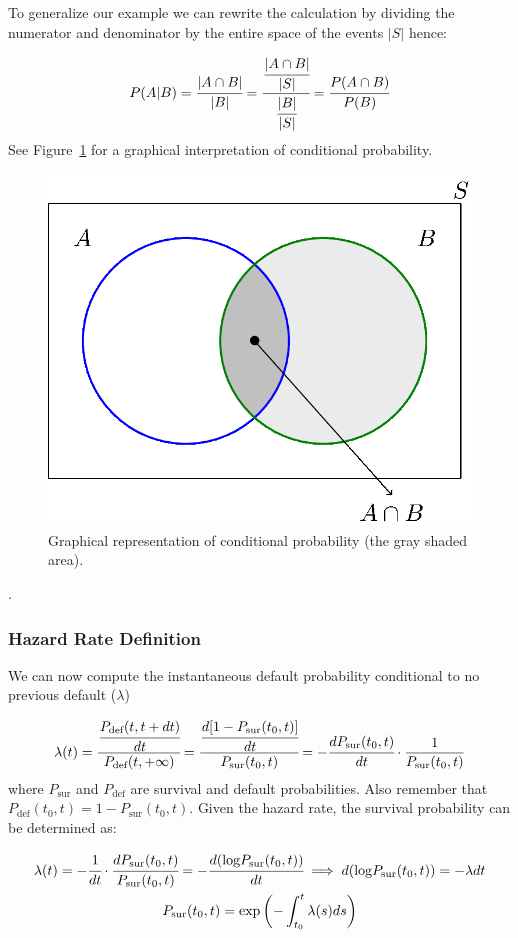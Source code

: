 To generalize our example we can rewrite the calculation by dividing the numerator and denominator by the entire space of the events \(|S|\) hence:

\begin{equation}
P(A|B) = \cfrac{|A\cap B|}{|B|} = \cfrac{\cfrac{|A\cap B|}{|S|}}{\cfrac{|B|}{|S|}} = \cfrac{P(A\cap B)}{P(B)}
\end{equation}
See Figure~\ref{fig:conditional_prob} for a graphical interpretation of conditional probability.

\begin{figure}[tb]
\centering
\includegraphics[width=0.5\linewidth]{figures/conditional_b}
\caption{Graphical representation of conditional probability (the gray shaded area).}
\label{fig:conditional_prob}
\end{figure}
.
\subsubsection{Hazard Rate Definition}
We can now compute the instantaneous default probability conditional to no previous default ($\lambda$)

\begin{equation}
\lambda(t) = \cfrac{\cfrac{P_{\textrm{def}}(t, t+dt)}{dt}}{P_{\textrm{def}}(t, +\infty)} = \cfrac{\cfrac{d[1-P_{\textrm{sur}}(t_0, t)]}{dt}}{P_{\textrm{sur}}(t_0, t)} = -\cfrac{dP_{\textrm{sur}}(t_0, t)}{dt}\cdot\frac{1}{P_{\textrm{sur}}(t_0, t)}
\end{equation}
where $P_{\textrm{sur}}$ and $P_{\textrm{def}}$ are survival and default probabilities.
Also remember that $P_{\textrm{def}}(t_0, t) = 1 - P_{\textrm{sur}}(t_0, t)$. Given the hazard rate, the survival probability can be determined as:

\begin{equation}
\begin{gathered}
\lambda(t) = -\cfrac{1}{dt}\cdot\cfrac{dP_{\textrm{sur}}(t_0, t)}{P_{\textrm{sur}}(t_0, t)} = -\cfrac{d(\textrm{log}P_{\textrm{sur}}(t_0, t))}{dt} \implies d(\textrm{log}P_{\textrm{sur}}(t_0, t)) = -\lambda dt\\
P_{\textrm{sur}}(t_0, t) = \mathrm{exp}\left(-\int_{t_0}^{t}\lambda(s) ds\right)
\end{gathered}
\end{equation}

